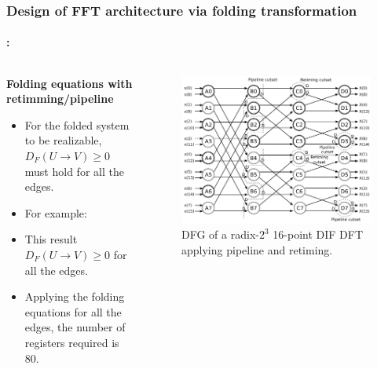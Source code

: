 \begin{frame}
	\frametitle{\textbf{Design of FFT architecture via folding transformation}}
	\framesubtitle{\secname : \subsecname}
		\vspace{-0.5cm}
	    \begin{columns}[t,onlytextwidth]
	      \begin{column}{0.45\linewidth}
			\begin{block}{\centering \textbf{Folding equations with retimming/pipeline}}	      	
	        	\begin{itemize} \justifying\footnotesize
					\item For the folded system to be realizable, $D_F(U\to V)\geq0$ must hold for all the edges. \vfill
					\item For example: \vfill
						
					\item This result $D_F(U\to V)\geq0$ for all the edges.
					\item Applying the folding equations for all the edges, the number of registers required is 80. \vfill
	      		\end{itemize}
			\end{block}	      
	      \end{column}
	      \begin{column}{0.50\linewidth}
	      \vspace{1cm}
			    \begin{figure}[h!] \centering
	    			\includegraphics[width=0.45\paperwidth]{./image/16points_dfg_ret.png}
	    			\caption{\footnotesize DFG of a radix-$2^3$ 16-point DIF DFT applying pipeline and retiming.}
	    			\label{fig:16_point_ret}
	    		\end{figure}    
	      \end{column}
	    \end{columns}
\end{frame}

